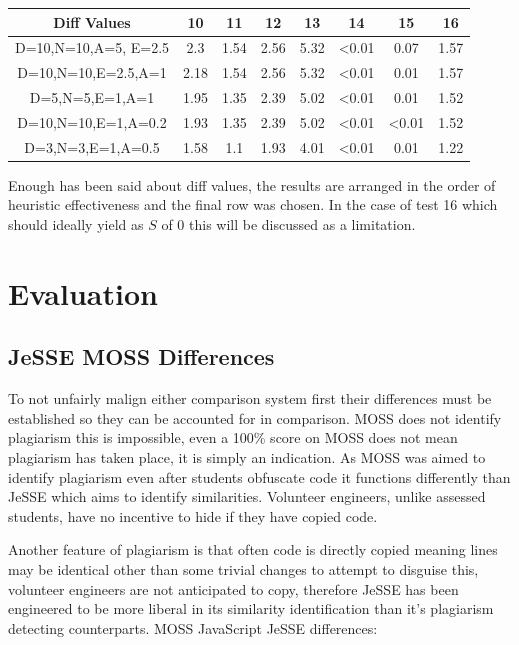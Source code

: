 \documentclass[jou,apacite]{apa6}
\begin{document}
\setlength{\tabcolsep}{1pt}
\renewcommand{\arraystretch}{1.5}

\begin{center}
 \begin{tabular}{||c c c c c c c c ||} 
 \hline
 Diff Values & 10 & 11 & 12 & 13 & 14 & 15 & 16 \\ [-0.2ex] 
 \hline\hline
 D=10,N=10,A=5, E=2.5 & 2.3 & 1.54 & 2.56 & 5.32 & <0.01 & 0.07 & 1.57 \\ 
 \hline
 D=10,N=10,E=2.5,A=1  & 2.18 & 1.54 & 2.56 & 5.32 & <0.01 & 0.01 & 1.57  \\
 \hline
 D=5,N=5,E=1,A=1  & 1.95 & 1.35 & 2.39 & 5.02 & <0.01 & 0.01 & 1.52  \\
 \hline
  D=10,N=10,E=1,A=0.2  & 1.93 & 1.35 & 2.39 & 5.02 & <0.01 & <0.01 & 1.52  \\
  \hline
    D=3,N=3,E=1,A=0.5  & 1.58 & 1.1 & 1.93 & 4.01 & <0.01 & 0.01 & 1.22 \\
  \hline
\end{tabular}
\end{center}

Enough has been said about diff values, the results are arranged in the order of heuristic effectiveness and the final row was chosen. In the case of test 16 which should ideally yield as $S$ of 0 this will be discussed as a limitation.

\clearpage

\section{Evaluation}
\subsection{JeSSE MOSS Differences}
To not unfairly malign either comparison system first their differences must be established so they can be accounted for in comparison.  MOSS does not identify plagiarism this is impossible, even a 100\% score on MOSS does not mean plagiarism has taken place, it is simply an indication. As MOSS was aimed to identify plagiarism even after students obfuscate code it functions differently than JeSSE which aims to identify similarities. Volunteer engineers, unlike assessed students,  have no incentive to hide if they have copied code.

Another feature of plagiarism is that often code is directly copied meaning lines may be identical other than some trivial changes to attempt to disguise this, volunteer engineers are not anticipated to copy, therefore JeSSE has been engineered to be more liberal in its similarity identification than it’s plagiarism detecting counterparts. MOSS JavaScript JeSSE differences: 
\end{document}
